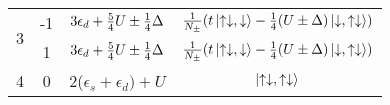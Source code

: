 \documentclass{article}
\begin{document}
\begin{table}[htb]
\begin{center}
\begin{tabular}{@{}cccc@{}}
                                        \toprule

\multirow{2}{*}{3} & -1 & \(3\epsilon_d + \frac{5}{4}U \pm \frac{1}{4}\Delta\)  & \(\frac{1}{N_\pm}(t\ket{\uparrow\downarrow,\downarrow}-\frac{1}{4}(U\pm\Delta)\ket{\downarrow,\uparrow\downarrow})\) \\

 \cmidrule(l){2-4}

& 1 & \(3\epsilon_d + \frac{5}{4}U \pm \frac{1}{4}\Delta\)  & \(\frac{1}{N_\pm}(t\ket{\uparrow\downarrow,\downarrow}-\frac{1}{4}(U\pm\Delta)\ket{\downarrow,\uparrow\downarrow})\) \\
 \toprule

4                                      & 0                   & 2(\(\epsilon_s+\epsilon_d)+U\)  & \(\ket{\uparrow\downarrow,\uparrow\downarrow}\) \\


\toprule
\end{tabular}
\end{center}
\end{table}
\end{document}

